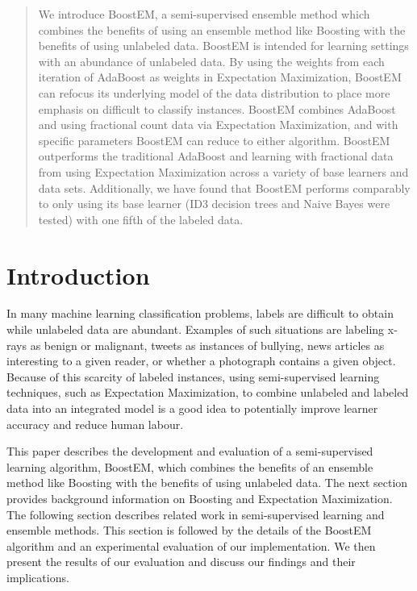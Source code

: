 \documentclass{sig-alternate}
\begin{document}
\maketitle
\begin{abstract}
We introduce BoostEM, a semi-supervised ensemble method which combines the benefits of using an ensemble method like Boosting with the benefits of using unlabeled data.  BoostEM is intended for learning settings with an abundance of unlabeled data. By using the weights from each iteration of AdaBoost as weights in Expectation Maximization, BoostEM can refocus its underlying model of the data distribution to place more emphasis on difficult to classify instances. BoostEM combines AdaBoost and using fractional count data via Expectation Maximization, and with specific parameters BoostEM can reduce to either algorithm. BoostEM outperforms the traditional AdaBoost and learning with fractional data from using Expectation Maximization across a variety of base learners and data sets. Additionally, we have found that BoostEM performs comparably to only using its base learner (ID3 decision trees and Naive Bayes were tested) with one fifth of the labeled data.  
\end{abstract}

\section{Introduction}

In many machine learning classification problems, labels are difficult to obtain while unlabeled data are abundant. Examples of such situations are labeling x-rays as benign or malignant, tweets as instances of bullying, news articles as interesting to a given reader, or whether a photograph contains a given object. Because of this scarcity of labeled instances, using semi-supervised learning techniques, such as Expectation Maximization, to combine unlabeled and labeled data into an integrated model is a good idea to potentially improve learner accuracy and reduce human labour.

This paper describes the development and evaluation of a semi-supervised learning algorithm, BoostEM, which combines the benefits of an ensemble method like Boosting with the benefits of using unlabeled data. The next section provides background information on Boosting and Expectation Maximization. The following section describes related work in semi-supervised learning and ensemble methods. This section is followed by the details of the BoostEM algorithm and an experimental evaluation of our implementation. We then present the results of our evaluation and discuss our findings and their implications.
\end{document}
